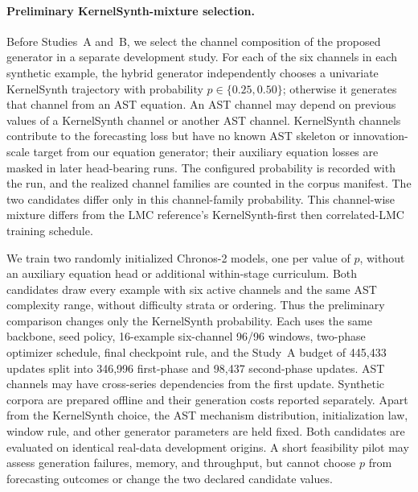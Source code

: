 \paragraph{Preliminary KernelSynth-mixture selection.}
Before Studies~A and~B, we select the channel composition of the proposed
generator in a separate development study. For each of the six channels in
each synthetic example, the hybrid generator independently chooses a
univariate KernelSynth trajectory with probability
$p\in\{0.25,0.50\}$; otherwise it generates that channel from an AST
equation. An AST channel may depend on previous values of a KernelSynth
channel or another AST channel. KernelSynth channels contribute to the
forecasting loss but have no known AST skeleton or innovation-scale target
from our equation generator; their auxiliary equation losses are masked in
later head-bearing runs. The configured probability is recorded with the run,
and the realized channel families are counted in the corpus manifest. The two
candidates differ only in this channel-family probability.
This channel-wise mixture differs from the LMC reference's KernelSynth-first
then correlated-LMC training schedule.

We train two randomly initialized Chronos-2 models, one per value of $p$,
without an auxiliary equation head or additional within-stage curriculum.
Both candidates draw every example with six active channels and the same
AST complexity range, without difficulty strata or ordering. Thus the
preliminary comparison changes only the KernelSynth probability.
Each uses the same backbone, seed policy, 16-example six-channel 96/96
windows, two-phase optimizer schedule, final
checkpoint rule, and the Study~A budget of 445,433 updates split into
346,996 first-phase and 98,437 second-phase updates. AST channels may have
cross-series dependencies from the first update. Synthetic corpora are
prepared offline and their generation costs reported separately. Apart from
the KernelSynth choice, the AST mechanism distribution, initialization law,
window rule, and other generator parameters are held fixed. Both candidates
are evaluated on identical real-data development origins. A short feasibility
pilot may assess generation failures,
memory, and throughput, but cannot choose $p$ from forecasting outcomes or
change the two declared candidate values.

